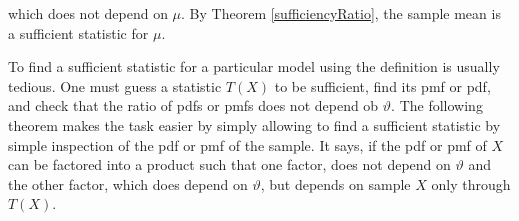 \documentclass[ 11pt,%
				a4paper,%
				twoside,%
				headinclude,%
				footinclude = true,%
				cleardoublepage = empty,%
				reqno]{scrbook}
\begin{document}
\begin{example}
which does not depend on $\mu$. By Theorem \ref{sufficiencyRatio}, the sample mean is a sufficient statistic for $\mu$.

\end{example}

To find a sufficient statistic for a particular model using the definition is usually tedious. One must guess a statistic $T(X)$
to be sufficient, find its  pmf or pdf, and check that the ratio of pdfs or pmfs does not depend ob $\vartheta$. The following theorem makes the task easier by simply allowing to find a sufficient statistic by simple inspection of the pdf or pmf of the sample. It says, if the pdf or pmƒ of $X$ can be factored into a product such that one factor, does not depend on $\vartheta$ and the other factor, which does depend on $\vartheta$, but depends on sample $X$ only through $T(X)$.
\end{document}
